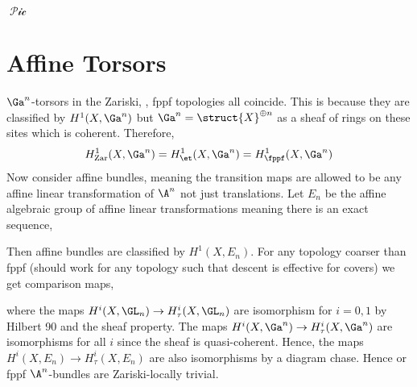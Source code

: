 \documentclass[12pt]{article}
\begin{document}
$\mathop{\mathscr{Pic}}$

\section{Affine Torsors}

\newcommand{\Zar}{\mathrm{Zar}}

$\Ga^n$-torsors in the Zariski, \etale, fppf topologies all coincide. This is because they are classified by $H^1(X, \Ga^n)$ but $\Ga^n = \struct{X}^{\oplus n}$ as a sheaf of rings on these sites which is coherent. Therefore, 
\[ H^1_{\Zar}(X, \Ga^n) = H^1_{\et}(X, \Ga^n) = H^1_{\fppf}(X, \Ga^n) \]
Now consider affine bundles, meaning the transition maps are allowed to be any affine linear transformation of $\A^n$ not just translations. Let $E_n$ be the affine algebraic group of affine linear transformations meaning there is an exact sequence,
\begin{center}
\end{center}
Then affine bundles are classified by $H^1(X, E_n)$. For any topology coarser than fppf (should work for any topology such that descent is effective for covers) we get comparison maps,
\begin{center}
\end{center}
where the maps $H^i(X, \GL_n) \to H^i_{\tau}(X, \GL_n)$ are isomorphism for $i = 0,1$ by Hilbert 90 and the sheaf property. The maps $H^i(X, \Ga^n) \to H^i_{\tau}(X, \Ga^n)$ are isomorphisms for all $i$ since the sheaf is quasi-coherent. Hence, the maps $H^i(X, E_n) \to H^i_{\tau}(X, E_n)$ are also isomorphisms by a diagram chase. Hence \etale or fppf $\A^n$-bundles are Zariski-locally trivial.
\end{document}

